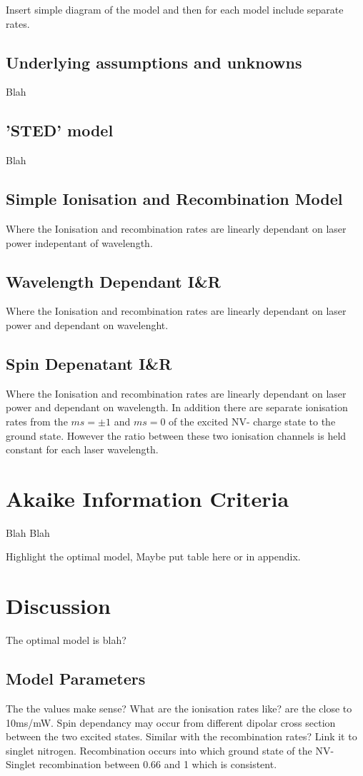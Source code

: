 \documentclass[preprint,prl,twocolumn]{revtex4}
\begin{document}
Insert simple diagram of the model and then for each model include separate rates.

\subsection{Underlying assumptions and unknowns}
Blah

\subsection{'STED' model}
Blah
\subsection{Simple Ionisation and Recombination Model}
Where the Ionisation and recombination rates are linearly dependant on laser power indepentant of wavelength.
\subsection{Wavelength Dependant I\&R}
Where the Ionisation and recombination rates are linearly dependant on laser power and dependant on wavelenght.
\subsection{Spin Depenatant I\&R}
Where the Ionisation and recombination rates are linearly dependant on laser power and dependant on wavelength. In addition there are separate ionisation rates from the $ms=\pm1$ and $ms=0$ of the excited NV- charge state to the ground state. However the ratio between these two ionisation channels is held constant for each laser wavelength.


\section{Akaike Information Criteria}
Blah Blah

Highlight the optimal model, Maybe put table here or in appendix.

\section{Discussion}
The optimal model is blah?

\subsection{Model Parameters}
The the values make sense?
What are the ionisation rates like? are the close to 10ms/mW. Spin dependancy may occur from different dipolar cross section between the two excited states.
Similar with the recombination rates? Link it to singlet nitrogen.
Recombination occurs into which ground state of the NV- 
Singlet recombination between 0.66 and 1 which is consistent.
\end{document}
